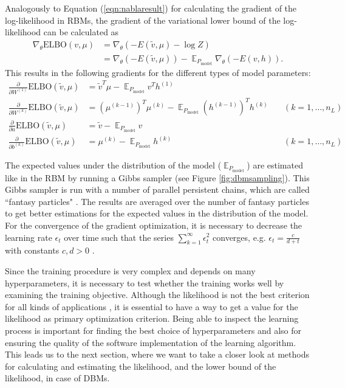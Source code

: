 \documentclass[12pt]{article}
\newcommand{\ELBO}{\mathrm{ELBO}}
\DeclareMathOperator{\EX}{\mathbb{E}}
\begin{document}
Analogously to Equation (\ref{eqn:nablaresult}) for calculating the gradient of the log-likelihood in RBMs, the gradient of the variational lower bound of the log-likelihood can be calculated as
\begin{align*}
\nabla_{\theta} \ELBO(v, \mu) &= \nabla_{\theta} ( - E(\tilde{v}, \mu) - \log Z ) \\
 &= \nabla_{\theta} (- E(\tilde{v}, \mu)) - \EX_{P_\text{model}} \nabla_{\theta} (-E(v, h)).
\end{align*}
This results in the following gradients for the different types of model parameters:
\begin{align*}
\frac{\partial}{\partial W^{(1)}} \ELBO(\tilde{v}, \mu) &= \tilde{v}^T \mu - \EX_{P_\text{model}} v^T h^{(1)} \\
\frac{\partial}{\partial W^{(k)}} \ELBO(\tilde{v}, \mu) &= (\mu^{(k-1)})^T \mu^{(k)}  - \EX_{P_\text{model}} (h^{(k-1)})^T h^{(k)} &\quad(k = 1, \dots, n_L)\\
\frac{\partial}{\partial a}  \ELBO(\tilde{v}, \mu) &=  \tilde{v} - \EX_{P_\text{model}}  v \\
\frac{\partial}{\partial b^{(k)}}  \ELBO(\tilde{v}, \mu) &=  \mu^{(k)} - \EX_{P_\text{model}} h^{(k)}  &\quad ( k = 1, \dots, n_L)
\end{align*}

The expected values under the distribution of the model ($\EX_{P_\text{model}}$) are estimated like in the RBM by running a Gibbs sampler (see Figure \ref{fig:dbmsampling}).
This Gibbs sampler is run with a number of parallel persistent chains, which are called ``fantasy particles" \citep{salakhutdinov2009DBMs}. The results are averaged over the number of fantasy particles to get better estimations for the expected values in the distribution of the model.
For the convergence of the gradient optimization, it is necessary to decrease the learning rate $\epsilon_t$ over time such that the series $\sum_{k=1}^\infty \epsilon_t^2$ converges, e.g. $\epsilon_t = \frac{c}{d+t}$ with constants $c, d > 0$ \citep{sala2012anefficient}.

Since the training procedure is very complex and depends on many hyperparameters, it is necessary to test whether the training works well by examining the training objective.
Although the likelihood is not the best criterion for all kinds of applications \citep{theis_note_2015}, it is essential to have a way to get a value for the likelihood as primary optimization criterion.
Being able to inspect the learning process is important for finding the best choice of hyperparameters and also for ensuring the quality of the software implementation of the learning algorithm.
This leads us to the next section, where we want to take a closer look at methods for calculating and estimating the likelihood, and the lower bound of the likelihood, in case of DBMs.
\end{document}
